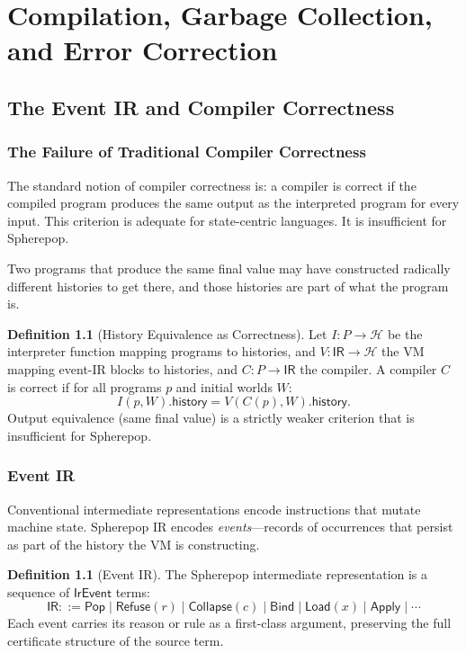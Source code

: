 \documentclass[12pt, a4paper, openany]{book}
\theoremstyle{plain}
\theoremstyle{definition}
\newtheorem{definition}[theorem]{Definition}
\theoremstyle{remark}
\newcommand{\Pop}{\mathsf{Pop}}
\newcommand{\Refuse}{\mathsf{Refuse}}
\newcommand{\Bind}{\mathsf{Bind}}
\newcommand{\Collapse}{\mathsf{Collapse}}
\newcommand{\calH}{\mathcal{H}}
\begin{document}
\part{Compilation, Garbage Collection, and Error Correction}

\chapter{The Event IR and Compiler Correctness}
\label{ch:compiler}

\section{The Failure of Traditional Compiler Correctness}

The standard notion of compiler correctness is: a compiler is correct if the
compiled program produces the same output as the interpreted program for every
input. This criterion is adequate for state-centric languages. It is insufficient
for Spherepop.

Two programs that produce the same final value may have constructed radically
different histories to get there, and those histories are part of what the program
is.

\begin{definition}[History Equivalence as Correctness]
Let $I : P \to \calH$ be the interpreter function mapping programs to histories,
and $V : \mathsf{IR} \to \calH$ the VM mapping event-IR blocks to histories,
and $C : P \to \mathsf{IR}$ the compiler. A compiler $C$ is correct if for all
programs $p$ and initial worlds $W$:
\[
I(p, W).\mathsf{history} = V(C(p), W).\mathsf{history}.
\]
Output equivalence (same final value) is a strictly weaker criterion that is
insufficient for Spherepop.
\end{definition}

\section{Event IR}

Conventional intermediate representations encode instructions that mutate machine
state. Spherepop IR encodes \emph{events}---records of occurrences that persist
as part of the history the VM is constructing.

\begin{definition}[Event IR]
The Spherepop intermediate representation is a sequence of $\mathsf{IrEvent}$
terms:
\[
\mathsf{IR} ::= \Pop \mid \Refuse(r) \mid \Collapse(c) \mid \Bind \mid \mathsf{Load}(x) \mid \mathsf{Apply} \mid \cdots
\]
Each event carries its reason or rule as a first-class argument, preserving the
full certificate structure of the source term.
\end{definition}
\end{document}
